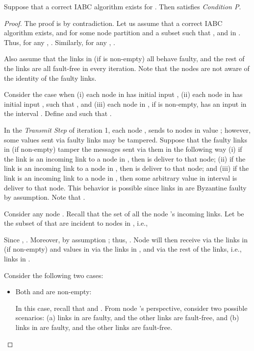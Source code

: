 \documentclass{llncs}
\begin{document}
\begin{theorem}
\label{thm:nc}
Suppose that a correct IABC algorithm exists for . Then  satisfies {\em Condition P}.
\end{theorem}
\begin{proof}



The proof is by contradiction.
Let us assume that a correct IABC algorithm exists,
and for some node partition  and a subset  such that ,  and  in .
Thus, for any , . Similarly,
for any  , .



Also assume that the links in  (if  is non-empty) all behave faulty, and the rest of the links are all fault-free in every iteration. Note that the nodes are not aware of the identity of the faulty links.

Consider the case when (i) each node in  has initial input , (ii) each
node in  has initial input , such that ,
and (iii) each node in , if  is non-empty,
has an input in the interval . Define  and  such that .

In the {\em Transmit Step} of iteration 1, each node , sends to nodes in  value ; however, some values sent via faulty links may be tampered. Suppose that the faulty links in  (if non-empty) tamper the messages sent via them in the following way (i) if the link is an incoming link to a node in , then  is deliver to that node;
(ii) if the link is an incoming link to a node in , then  is deliver to that node; and (iii) if the link is an incoming link to a node in , then some arbitrary value in interval  is deliver to that node. This behavior is possible since links in  are Byzantine faulty by assumption. Note that . 

Consider any node . Recall that  the set of all the node 's incoming links. Let  be the subset of  that are incident to nodes in , i.e., 



Since , .
Moreover, by assumption ; thus, .
Node  will then receive  via the links in  (if non-empty)
and values in  via the links in , and
 via the rest of the links, i.e., links in .

Consider the following two cases:
\begin{itemize}

\item Both  and  are non-empty:

In this case, recall that  and .
From node 's perspective, consider two possible scenarios:
(a) links in  are faulty, and the other
links are fault-free, and (b) links in  are faulty, and the
other links are fault-free.


\end{itemize}
\end{proof}
\end{document}
